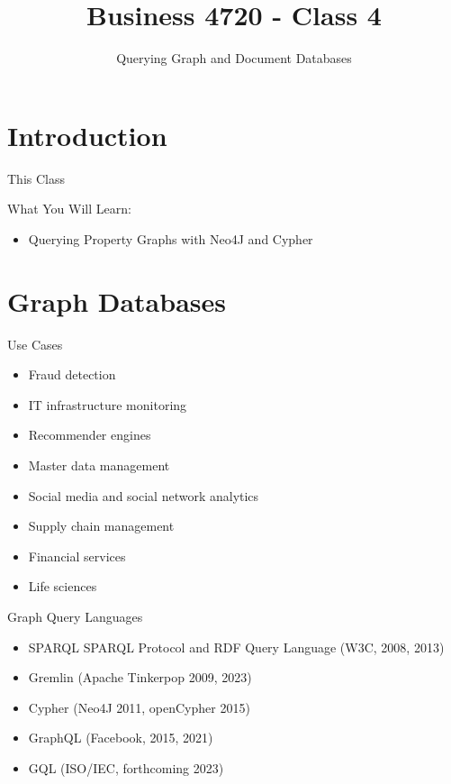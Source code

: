 \documentclass[ignorenonframetext,xcolor=x11names]{beamer}
\title{Business 4720 - Class 4}
\subtitle{Querying Graph and Document Databases}
\begin{document}
\begin{frame}{}
  \titlepage
  \footnotesize
  
\end{frame}

\section{Introduction}

\begin{frame}{This Class}

\begin{block}{What You Will Learn:}
\begin{itemize}
  \item Querying Property Graphs with Neo4J and Cypher
\end{itemize}
\end{block}
\end{frame}

\section{Graph Databases}

\begin{frame}{Use Cases}
\begin{itemize}
  \item Fraud detection
  \item IT infrastructure monitoring
  \item Recommender engines
  \item Master data management
  \item Social media and social network analytics
  \item Supply chain management
  \item Financial services
  \item Life sciences
\end{itemize}

\end{frame}


\begin{frame}{Graph Query Languages}

\begin{itemize}
  \item SPARQL SPARQL Protocol and RDF Query Language (W3C, 2008, 2013)
  \item Gremlin (Apache Tinkerpop 2009, 2023)
  \item Cypher (Neo4J 2011, openCypher 2015)
  \item GraphQL (Facebook, 2015, 2021)
  \item GQL (ISO/IEC, forthcoming 2023)
\end{itemize}

\end{frame}
\end{document}
